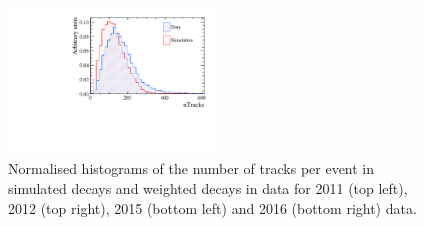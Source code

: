 \begin{figure}[tbp]
    \includegraphics[width=0.49\textwidth]{./Figs/LifetimeMeasurement/Bd2KPi_2016_data_MC_nTracks.pdf}
  \caption{Normalised histograms of the number of tracks per event in simulated \bdkpi decays and weighted \bdkpi decays in data for 2011 (top left), 2012 (top right), 2015 (bottom left) and 2016 (bottom right) data. }
  \label{fig:nTracksMCDataComp}
\end{figure}
\FloatBarrier
